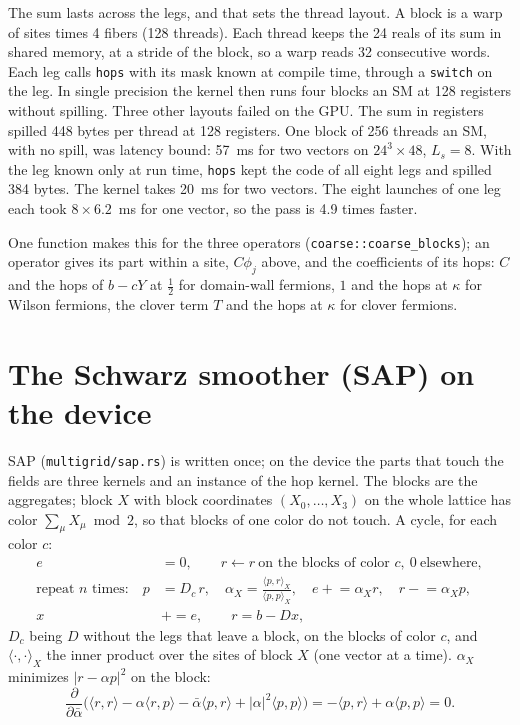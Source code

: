 \documentclass[11pt,a4paper]{article}
\numberwithin{equation}{section}
\newcommand{\code}[1]{\texttt{\small #1}}
\begin{document}
The sum lasts across the legs, and that sets the thread layout. A block is a warp of sites
times 4 fibers (128 threads). Each thread keeps the 24 reals of its sum in shared memory, at a
stride of the block, so a warp reads 32 consecutive words. Each leg calls \code{hops} with its
mask known at compile time, through a \code{switch} on the leg. In single precision the kernel
then runs four blocks an SM at 128 registers without spilling. Three other layouts failed on
the GPU. The sum in registers spilled 448 bytes per thread at 128 registers. One block of 256
threads an SM, with no spill, was latency bound: 57~ms for two vectors on $24^3\times48$,
$L_s=8$. With the leg known only at run time, \code{hops} kept the code of all eight legs and
spilled 384 bytes. The kernel takes 20~ms for two vectors. The eight launches of one leg each
took $8\times6.2$~ms for one vector, so the pass is 4.9 times faster.

One function makes this for the three operators (\code{coarse::coarse\_blocks}); an operator
gives its part within a site, $C\phi_j$ above, and the coefficients of its hops: $C$ and the hops
of $b-cY$ at $\tfrac12$ for domain-wall fermions, $1$ and the hops at $\kappa$ for Wilson
fermions, the clover term $T$ and the hops at $\kappa$ for clover fermions.

\section{The Schwarz smoother (SAP) on the device}

SAP (\code{multigrid/sap.rs}) is written once; on the device the parts that touch the fields are
three kernels and an instance of the hop kernel. The blocks are the aggregates; block $X$ with
block coordinates $(X_0,\dots,X_3)$ on the whole lattice has color $\sum_\mu X_\mu \bmod 2$, so
that blocks of one color do not touch. A cycle, for each color $c$:
\begin{align}
e &= 0,\qquad r \leftarrow r\ \text{on the blocks of color } c,\ 0\ \text{elsewhere},\\
\text{repeat } n \text{ times:}\quad p &= D_c\,r,\quad
\alpha_X = \frac{\langle p,r\rangle_X}{\langle p,p\rangle_X},\quad e \mathrel{+}= \alpha_X r,\quad
r \mathrel{-}= \alpha_X p,\\
x &\mathrel{+}= e,\qquad r = b - Dx,
\end{align}
$D_c$ being $D$ without the legs that leave a block, on the blocks of color $c$, and
$\langle\cdot,\cdot\rangle_X$ the inner product over the sites of block $X$ (one vector at a time).
$\alpha_X$ minimizes $|r-\alpha p|^2$ on the block:
\begin{equation}
\frac{\partial}{\partial\bar\alpha}\big(\langle r,r\rangle - \alpha\langle r,p\rangle - \bar\alpha\langle p,r\rangle + |\alpha|^2\langle p,p\rangle\big)
= -\langle p,r\rangle + \alpha\langle p,p\rangle = 0 .
\end{equation}
\end{document}
